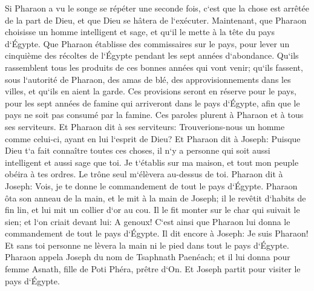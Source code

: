 \verse Si Pharaon a vu le songe se répéter une seconde fois, c`est que la chose est arrêtée de la part de Dieu, et que Dieu se hâtera de l`exécuter. 
\verse Maintenant, que Pharaon choisisse un homme intelligent et sage, et qu`il le mette à la tête du pays d`Égypte. 
\verse Que Pharaon établisse des commissaires sur le pays, pour lever un cinquième des récoltes de l`Égypte pendant les sept années d`abondance. 
\verse Qu`ils rassemblent tous les produits de ces bonnes années qui vont venir; qu`ils fassent, sous l`autorité de Pharaon, des amas de blé, des approvisionnements dans les villes, et qu`ils en aient la garde. 
\verse Ces provisions seront en réserve pour le pays, pour les sept années de famine qui arriveront dans le pays d`Égypte, afin que le pays ne soit pas consumé par la famine. 
\verse Ces paroles plurent à Pharaon et à tous ses serviteurs. 
\verse Et Pharaon dit à ses serviteurs: Trouverions-nous un homme comme celui-ci, ayant en lui l`esprit de Dieu? 
\verse Et Pharaon dit à Joseph: Puisque Dieu t`a fait connaître toutes ces choses, il n`y a personne qui soit aussi intelligent et aussi sage que toi. 
\verse Je t`établis sur ma maison, et tout mon peuple obéira à tes ordres. Le trône seul m`élèvera au-dessus de toi. 
\verse Pharaon dit à Joseph: Vois, je te donne le commandement de tout le pays d`Égypte. 
\verse Pharaon ôta son anneau de la main, et le mit à la main de Joseph; il le revêtit d`habits de fin lin, et lui mit un collier d`or au cou. 
\verse Il le fit monter sur le char qui suivait le sien; et l`on criait devant lui: A genoux! C`est ainsi que Pharaon lui donna le commandement de tout le pays d`Égypte. 
\verse Il dit encore à Joseph: Je suis Pharaon! Et sans toi personne ne lèvera la main ni le pied dans tout le pays d`Égypte. 
\verse Pharaon appela Joseph du nom de Tsaphnath Paenéach; et il lui donna pour femme Asnath, fille de Poti Phéra, prêtre d`On. Et Joseph partit pour visiter le pays d`Égypte. 
